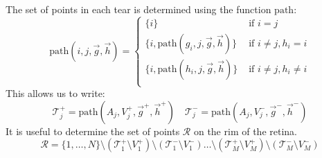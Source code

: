 \documentclass{article}
\begin{document}
The set of points in each tear is determined using the function
$\mathrm{path}$:
\begin{displaymath}
  \mathrm{path}(i, j, \vec{g}, \vec{h})  = \left\{ 
  \begin{array}{ll}
    \{i\} & \mbox{ if } i = j \\
      \{i, \mathrm{path}(g_i, j, \vec{g}, \vec{h})\} & \mbox{ if } i \ne j, h_i=i \\
      \{i, \mathrm{path}(h_i, j, \vec{g}, \vec{h})\}    & \mbox{ if } i \ne j, h_i\ne i \\
    \end{array}\right.
\end{displaymath}
This allows us to write:
\begin{displaymath}
  \mathcal{T}^+_j  = \mathrm{path}(A_j, V_j^+, \vec{g}^+, \vec{h}^+) \quad 
  \mathcal{T}^-_j  = \mathrm{path}(A_j, V_j^-, \vec{g}^-, \vec{h}^-)
\end{displaymath}
It is useful to determine the set of points $\mathcal{R}$ on the rim
of the retina.
\begin{displaymath}
  \mathcal{R} = \{1,\dots,N\} 
  \setminus (\mathcal{T}^+_1 \setminus V^+_1) 
  \setminus (\mathcal{T}^-_1 \setminus V^-_1)  
  \dots 
  \setminus (\mathcal{T}^+_M \setminus V^+_M)
  \setminus (\mathcal{T}^-_M \setminus V^-_M)
\end{displaymath}
\end{document}
